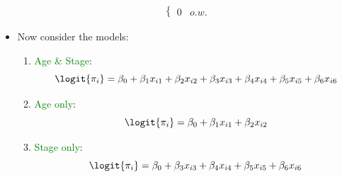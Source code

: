 \documentclass[oneside]{book}\usepackage[]{graphicx}\usepackage[svgnames]{xcolor}
\begin{document}
\begin{itemize}
\[\begin{array}{lll}
\begin{cases*}
                                        0 & o.w.
                                  \end{cases*}
                  \end{array} \]
      \item Now consider the models:
            \begin{enumerate}[1.]
                  \item \textcolor{Green}{Age \& Stage}:
                        \[ \logit{\pi_i}=\beta_0+\beta_1x_{i1}+\beta_2x_{i2}+\beta_3x_{i3}+\beta_4x_{i4}+\beta_5x_{i5}+\beta_6x_{i6} \]
                  \item \textcolor{Green}{Age only}:
                        \[ \logit{\pi_i}=\beta_0+\beta_1x_{i1}+\beta_2x_{i2} \]
                  \item \textcolor{Green}{Stage only}:
                        \[ \logit{\pi_i}=\beta_0+\beta_3x_{i3}+\beta_4x_{i4}+\beta_5x_{i5}+\beta_6x_{i6} \]
            \end{enumerate}
\end{itemize}
\end{document}
